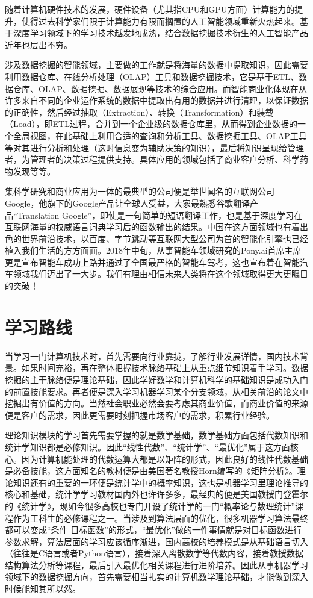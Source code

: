 \documentclass{elegantpaper}
\begin{document}
随着计算机硬件技术的发展，硬件设备（尤其指CPU和GPU方面）计算能力的提升，使得过去科学家们限于计算能力有限而搁置的人工智能领域重新火热起来。基于深度学习领域下的学习技术越发地成熟，结合数据挖掘技术衍生的人工智能产品近年也层出不穷。

涉及数据挖掘的智能领域，主要做的工作就是将海量的数据中提取知识，因此需要利用数据仓库、在线分析处理（OLAP）工具和数据挖掘技术，它是基于ETL、数据仓库、OLAP、数据挖掘、数据展现等技术的综合应用。而智能商业化体现在从许多来自不同的企业运作系统的数据中提取出有用的数据并进行清理，以保证数据的正确性，然后经过抽取（Extraction）、转换（Transformation）和装载（Load），即ETL过程，合并到一个企业级的数据仓库里，从而得到企业数据的一个全局视图，在此基础上利用合适的查询和分析工具、数据挖掘工具、OLAP工具等对其进行分析和处理（这时信息变为辅助决策的知识），最后将知识呈现给管理者，为管理者的决策过程提供支持。具体应用的领域包括了商业客户分析、科学药物发现等等。

集科学研究和商业应用为一体的最典型的公司便是举世闻名的互联网公司Google，他旗下的Google产品让全球人受益，大家最熟悉谷歌翻译产品“Translation Google”，即使是一句简单的短语翻译工作，也是基于深度学习在互联网海量的权威语言词典学习后的函数输出的结果。中国在这方面领域也有着出色的世界前沿技术，以百度、字节跳动等互联网大型公司为首的智能化引擎也已经植入我们生活的方方面面。2018年中旬，从事智能车领域研究的Pony.ai首席主席更是宣布智能车成功上路并通过了全国最严格的智能车驾考，这也宣布着在智能汽车领域我们迈出了一大步。我们有理由相信未来人类将在这个领域取得更大更瞩目的突破！

\section{学习路线}

当学习一门计算机技术时，首先需要向行业靠拢，了解行业发展详情，国内技术背景。如果时间充裕，再在整体把握技术脉络基础上从重点细节知识着手学习。数据挖掘的主干脉络便是理论基础，因此学好数学和计算机科学的基础知识是成功入门的前置技能要求。再者便是深入学习机器学习某个分支领域，从相关前沿的论文中挖掘出有价值的方向。当然社会职业必然会要考虑其商业价值，而商业价值的来源便是客户的需求，因此更需要时刻把握市场客户的需求，积累行业经验。

理论知识模块的学习首先需要掌握的就是数学基础，数学基础方面包括代数知识和统计学知识都是必修知识。因此“线性代数”、“统计学”、“最优化”属于这方面核心。因为计算机能处理的代数运算大都是以矩阵的形式，因此良好的线性代数基础是必备技能，这方面知名的教材便是由美国著名教授Horn编写的《矩阵分析》。理论知识还有的重要的一环便是统计学中的概率知识，这也是机器学习里理论推导的核心和基础，统计学学习教材国内外也许许多多，最经典的便是美国教授门登霍尔的《统计学》，现如今很多高校也专门开设了统计学的一门“概率论与数理统计”课程作为工科生的必修课程之一。当涉及到算法层面的优化，很多机器学习算法最终都可以变成“条件-目标函数”的形式，“最优化”做的一件事情就是对目标函数进行参数求解，算法层面的学习应该循序渐进，国内高校的培养模式是从基础语言切入（往往是C语言或者Python语言），接着深入离散数学等代数内容，接着教授数据结构算法分析等课程，最后引入最优化相关课程进行进阶培养。因此从事机器学习领域下的数据挖掘方向，首先需要相当扎实的计算机数学理论基础，才能做到深入时候能知其所以然。
\end{document}
